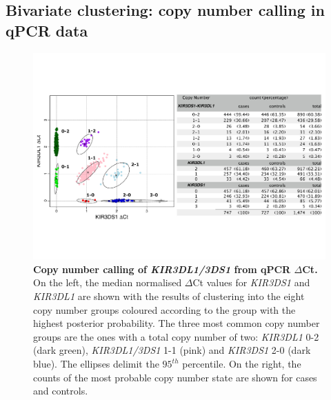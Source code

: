 \subsection{Bivariate clustering: copy number calling in qPCR data}


\begin{figure}[h!]
  \centering
  \includegraphics[scale=.5]{KIR/figures/Figure-1.pdf}
  \caption{ \label{Figure-1}
  \textbf{Copy number calling of \emph{KIR3DL1/3DS1} from qPCR $\Delta$Ct.}
  On the left, the median normalised $\Delta$Ct values for \emph{KIR3DS1} and
  \emph{KIR3DL1} are shown with the results of clustering into the eight
  copy number groups coloured according to the group with the
  highest posterior probability.  The three most common copy number groups are the
  ones with a total copy number of two: \emph{KIR3DL1} 0-2 (dark green),
  \emph{KIR3DL1/3DS1} 1-1 (pink) and \emph{KIR3DS1} 2-0 (dark
  blue).  The ellipses delimit the $95^{th}$ percentile.  On the right, the
  counts of the most probable copy number state are shown for cases and
  controls.}
\end{figure} 

